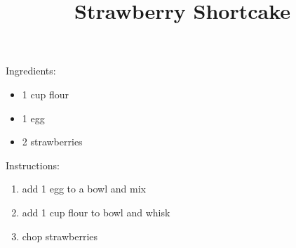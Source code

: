 \documentclass{article}
\begin{document}
\title{\Huge{}\selectfont
Strawberry Shortcake
}
\date{}
\maketitle

\begin{mdframed}
{\Large{}\selectfont
  Ingredients:}

\begin{itemize}
\item 1 cup flour
\item 1 egg
\item 2 strawberries
\end{itemize}
\end{mdframed}
\begin{mdframed}
{\Large{}\selectfont
  Instructions:}

\begin{enumerate}
\item add 1 egg to a bowl and mix
\item add 1 cup flour to bowl and whisk
\item chop strawberries
\end{enumerate}
\end{mdframed}
\end{document}
